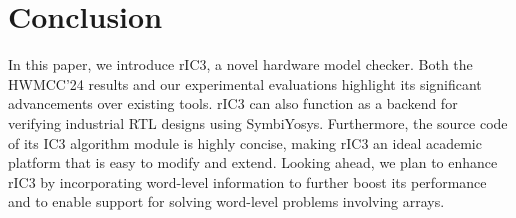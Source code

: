 \documentclass[runningheads]{llncs}
\begin{document}
\section{Conclusion}
In this paper, we introduce rIC3, a novel hardware model checker. Both the HWMCC’24 results and our experimental evaluations highlight its significant advancements over existing tools. rIC3 can also function as a backend for verifying industrial RTL designs using SymbiYosys. Furthermore, the source code of its IC3 algorithm module is highly concise, making rIC3 an ideal academic platform that is easy to modify and extend. Looking ahead, we plan to enhance rIC3 by incorporating word-level information to further boost its performance and to enable support for solving word-level problems involving arrays.



\end{document}
